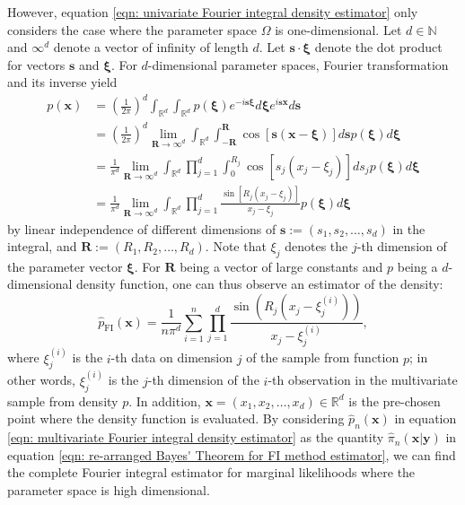 \documentclass[%
 reprint,
 amsmath,amssymb,
 aps,
]{revtex4-2}
\def\N{\mathbb{N}}
\def\R{\mathbb{R}}
\def\bxi{\boldsymbol{\xi}}
\def\bxi{\boldsymbol{\xi}}
\def\ybold{\mathbf{y}}
\def\xbold{\mathbf{x}}
\def\sbold{\mathbf{s}}
\def\Rbold{\mathbf{R}}
\begin{document}
However, equation \eqref{eqn: univariate Fourier integral density estimator} only considers the case where the parameter space $\Omega$ is one-dimensional. Let  $d \in \N$ and $\infty^d$ denote a vector of infinity of length $d$. Let $\mathbf{s} \cdot \bxi$ denote the dot product for vectors $\mathbf{s}$ and $\bxi$. For $d$-dimensional parameter spaces, Fourier transformation and its inverse yield
\begin{align} \label{eqn: multivariate Fourier integral}
    p(\xbold) & = \left(\frac{1}{2\pi}\right)^d\int_{\R^d} \int_{\R^d}p(\bxi) e^{-i\sbold\bxi}d\bxi e^{i\sbold\xbold}d\sbold \\
    & = \left(\frac{1}{2\pi}\right)^d \lim_{\Rbold \to \infty^d} \int_{\R^d} \int_{-\Rbold}^\Rbold \cos[\sbold(\xbold-\bxi)]d\sbold p(\bxi)d\bxi \\
    & = \frac{1}{\pi^d} \lim_{\Rbold \to \infty^d} \int_{\R^d} \prod_{j=1}^d \int_0^{R_j} \cos[s_j(x_j-\xi_j)]ds_j p(\bxi)d\bxi \\
    & = \frac{1}{\pi^d} \lim_{\Rbold \to \infty^d} \int_{\R^d} \prod_{j=1}^d \frac{\sin[R_j(x_j-\xi_j)]}{x_j-\xi_j} p(\bxi)d\bxi
\end{align}
by linear independence of different dimensions of $\sbold := (s_1, s_2, \ldots, s_d)$ in the integral, and $\Rbold := (R_1, R_2, \ldots, R_d)$. Note that $\xi_j$ denotes the $j$-th dimension of the parameter vector $\bxi$. For $\Rbold$ being a vector of large constants and $p$ being a $d$-dimensional density function, one can thus observe an estimator of the density:
\begin{equation} \label{eqn: multivariate Fourier integral density estimator}
    \hat{p}_\text{FI}(\mathbf{x}) = \frac{1}{n\pi^d}\sum_{i = 1}^n \prod_{j = 1}^d \frac{\sin(R_j(x_j - \xi_j^{(i)}))}{x_j - \xi_j^{(i)}},
\end{equation}
where $\xi_j^{(i)}$ is the $i$-th data on dimension $j$ of the sample from function $p$; in other words, $\xi_j^{(i)}$ is the $j$-th dimension of the $i$-th observation in the multivariate sample from density $p$. In addition, $\mathbf{x} = (x_1, x_2, \ldots, x_d) \in \R^d$ is the pre-chosen point where the density function is evaluated. By considering $\hat{p}_n(\mathbf{x})$ in equation \eqref{eqn: multivariate Fourier integral density estimator} as the quantity $\hat{\pi}_n (\xbold | \ybold)$ in equation \eqref{eqn: re-arranged Bayes' Theorem for FI method estimator}, we can find the complete Fourier integral estimator for marginal likelihoods where the parameter space is high dimensional.
\end{document}

